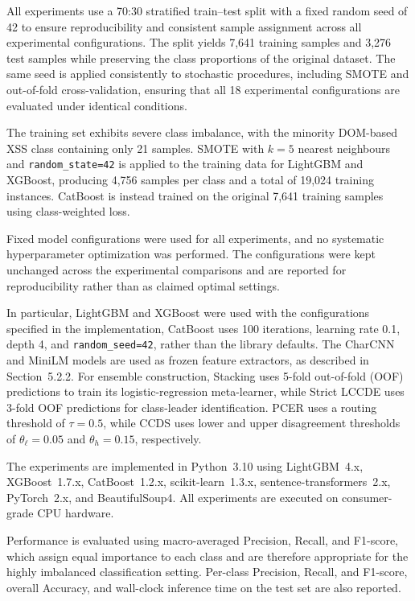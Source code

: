 \documentclass[11pt,a4paper]{article}
\begin{document}
All experiments use a 70:30 stratified train--test split with a fixed random
seed of 42 to ensure reproducibility and consistent sample assignment across
all experimental configurations. The split yields 7,641 training samples and
3,276 test samples while preserving the class proportions of the original
dataset. The same seed is applied consistently to stochastic procedures,
including SMOTE and out-of-fold cross-validation, ensuring that all 18
experimental configurations are evaluated under identical conditions.

The training set exhibits severe class imbalance, with the minority
DOM-based XSS class containing only 21 samples. SMOTE with $k=5$ nearest
neighbours and \texttt{random\_state=42} is applied to the training data for
LightGBM and XGBoost, producing 4,756 samples per class and a total of 19,024
training instances. CatBoost is instead trained on the original 7,641
training samples using class-weighted loss.

Fixed model configurations were used for all experiments, and no systematic hyperparameter optimization was performed. The configurations were kept unchanged across the experimental comparisons and are reported for reproducibility rather than as claimed optimal settings.

In particular, LightGBM and XGBoost were used with the configurations specified in the implementation, CatBoost uses 100 iterations, learning rate 0.1,
depth 4, and \texttt{random\_seed=42}, rather than the library defaults. The CharCNN and MiniLM models are used as frozen feature
extractors, as described in Section~5.2.2. 
For ensemble construction, Stacking uses 5-fold out-of-fold (OOF) predictions
to train its logistic-regression meta-learner, while Strict LCCDE uses 3-fold
OOF predictions for class-leader identification. PCER uses a routing
threshold of $\tau=0.5$, while CCDS uses lower and upper disagreement
thresholds of $\theta_{\ell}=0.05$ and $\theta_{h}=0.15$, respectively.

The experiments are implemented in Python~3.10 using LightGBM~4.x,
XGBoost~1.7.x, CatBoost~1.2.x, scikit-learn~1.3.x,
sentence-transformers~2.x, PyTorch~2.x, and BeautifulSoup4. All experiments
are executed on consumer-grade CPU hardware.

Performance is evaluated using macro-averaged Precision, Recall, and F1-score,
which assign equal importance to each class and are therefore appropriate for
the highly imbalanced classification setting. Per-class Precision, Recall,
and F1-score, overall Accuracy, and wall-clock inference time on the test set
are also reported.
\end{document}
